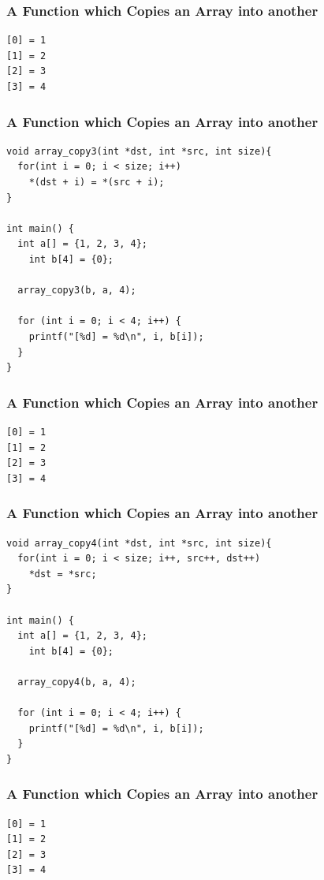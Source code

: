 \documentclass{../c-lecture}
\begin{document}
\begin{frame}[fragile]
  \frametitle{A Function which Copies an Array into another}
  \begin{verbatim}
[0] = 1
[1] = 2
[2] = 3
[3] = 4
  \end{verbatim}
\end{frame}

\begin{frame}[fragile]
  \frametitle{A Function which Copies an Array into another}
  \scriptsize
  \begin{verbatim}
void array_copy3(int *dst, int *src, int size){
  for(int i = 0; i < size; i++)
    *(dst + i) = *(src + i);
}

int main() {
  int a[] = {1, 2, 3, 4};
	int b[4] = {0};

  array_copy3(b, a, 4);

  for (int i = 0; i < 4; i++) {
    printf("[%d] = %d\n", i, b[i]);
  }
}
  \end{verbatim}
\end{frame}

\begin{frame}[fragile]
  \frametitle{A Function which Copies an Array into another}
  \begin{verbatim}
[0] = 1
[1] = 2
[2] = 3
[3] = 4
  \end{verbatim}
\end{frame}

\begin{frame}[fragile]
  \frametitle{A Function which Copies an Array into another}
  \scriptsize
  \begin{verbatim}
void array_copy4(int *dst, int *src, int size){
  for(int i = 0; i < size; i++, src++, dst++)
    *dst = *src;
}

int main() {
  int a[] = {1, 2, 3, 4};
	int b[4] = {0};

  array_copy4(b, a, 4);

  for (int i = 0; i < 4; i++) {
    printf("[%d] = %d\n", i, b[i]);
  }
}
  \end{verbatim}
\end{frame}

\begin{frame}[fragile]
  \frametitle{A Function which Copies an Array into another}
  \begin{verbatim}
[0] = 1
[1] = 2
[2] = 3
[3] = 4
  \end{verbatim}
\end{frame}
\end{document}
